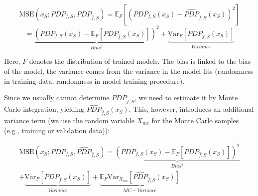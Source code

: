 \documentclass[runningheads]{llncs}
\begin{document}
\begin{equation}
    \text{MSE}(x_S; PDP_{f,S}, PDP_{\hat f,S})
    = \mathbb{E}_F[{(PDP_{f,S}(x_S) - \widehat{PDP}_{\hat f,S}(x_S))}^2]
\end{equation}
\begin{equation}
    = \underbrace{{(PDP_{f,S}(x_S) - \mathbb{E}_F[PDP_{\hat{f},S}(x_S)])}^2}_{Bias^2} + \underbrace{\text{Var}_F[PDP_{\hat{f},S}(x_S)]}_{Variance}
\end{equation}

\noindent Here, $F$ denotes the distribution of trained models. The bias
is linked to the bias of the model, the variance comes from the variance
in the model fits (randomness in training data, randomness in model training procedure).

Since we usually cannot determine $PDP_{\hat f,S}$, we need to estimate it by
Monte Carlo integration, yielding $\widehat{PDP}_{\hat f,S}(x_S)$. This,
however, introduces an additional variance term (we use the random variable
$X_{mc}$ for the Monte Carlo samples (e.g., training or validation data)):

\begin{equation}
    \begin{split}
        \text{MSE}(x_S; PDP_{f,S}, \widehat{PDP}_{\hat f,S})
        = \underbrace{{(PDP_{f,S}(x_S) - \mathbb{E}_F[PDP_{\hat{f}, S}(x_S)])}^2}_{Bias^2} \\
        + \underbrace{\text{Var}_F[PDP_{\hat{f},S}(x_S)]}_{Variance} + \underbrace{\mathbb{E}_F\text{Var}_{X_{mc}}[\widehat{PDP}_{\hat{f},S}(x_S)]}_{MC-Variance}
    \end{split}
\end{equation}
\end{document}
